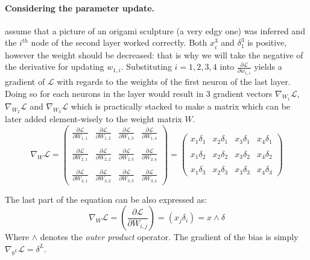 \paragraph{Considering the parameter update.} assume that a picture of an origami sculpture (a very edgy one) was inferred and the $i^{th}$ node of the second layer worked correctly. Both $x^3_i$ and $\delta^3_1$ is positive, however the weight should be decreased: that is why we will take the negative of the derivative for updating $w_{1,i}$.
Substituting $i=1,2,3,4$ into $\frac{\partial \mathcal{L}}{\partial w_{1,i}}$ yields a gradient of $\mathcal{L}$ with regards to the weights of the first neuron of the last layer. 
Doing so for each neurons in the layer would result in 3 gradient vectors $\nabla_{W_1} \mathcal{L}$, $\nabla_{W_2} \mathcal{L}$ and $\nabla_{W_3 }\mathcal{L}$ which is practically stacked to make a matrix which can be later added element-wisely to the weight matrix $W$.
$$
\nabla_W \mathcal{L} = 
\begin{pmatrix}
\frac{\partial \mathcal{L}}{\partial W_{1,1}} & \frac{\partial \mathcal{L}}{\partial W_{1,2}} & \frac{\partial \mathcal{L}}{\partial W_{1,3}} & \frac{\partial \mathcal{L}}{\partial W_{1,4}} \\ \\
\frac{\partial \mathcal{L}}{\partial W_{2,1}} & \frac{\partial \mathcal{L}}{\partial W_{2,2}} & \frac{\partial \mathcal{L}}{\partial W_{2,3}} & \frac{\partial \mathcal{L}}{\partial W_{2,4}} \\ \\
\frac{\partial \mathcal{L}}{\partial W_{3,1}} & \frac{\partial \mathcal{L}}{\partial W_{3,2}} & \frac{\partial \mathcal{L}}{\partial W_{3,3}} & \frac{\partial \mathcal{L}}{\partial W_{3,4}}
\end{pmatrix} = 
\begin{pmatrix}
 x_1 \delta_1 &  x_2 \delta_1 &  x_3 \delta_1 &  x_4 \delta_1 \\ \\
 x_1 \delta_2 &  x_2 \delta_2 &  x_3 \delta_2 &  x_4 \delta_2 \\ \\
 x_1 \delta_3 &  x_2 \delta_3 &  x_3 \delta_3 &  x_4 \delta_3
\end{pmatrix}
$$

The last part of the equation can be also expressed as:
\begin{equation}
\nabla_W \mathcal{L} = \left(\frac{\partial \mathcal{L}}{\partial W_{i,j}}\right) = \left(x_j \delta_i\right) = x \wedge \delta
\end{equation}
Where $\wedge$ denotes the \emph{outer product} operator. 
The gradient of the bias is simply $\nabla_{b^L} \mathcal{L} = \delta^L$.


